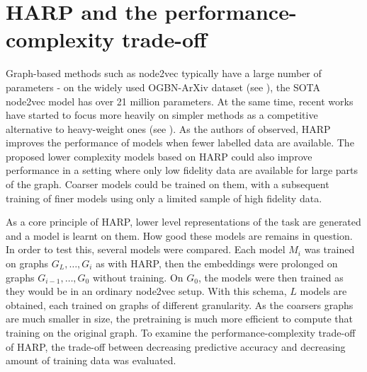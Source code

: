 \section{HARP and the performance-complexity trade-off}\label{sec:performance-vs-complexity}

Graph-based methods such as node2vec typically have a large number of parameters - on the widely used OGBN-ArXiv dataset (see \cite{hu_open_2021}), the SOTA node2vec model has over 21 million parameters. At the same time, recent works have started to focus more heavily on simpler methods as a competitive alternative to heavy-weight ones (see \cite{frasca_sign_2020,huang_combining_2020,salha_keep_2019,zhang_eigen-gnn_2020}). As the authors of \cite{chen_harp_2018} observed, HARP improves the performance of models when fewer labelled data are available. The proposed lower complexity models based on HARP could also improve performance in a setting where only low fidelity data are available for large parts of the graph. Coarser models could be trained on them, with a subsequent training of finer models using only a limited sample of high fidelity data.

As a core principle of HARP, lower level representations of the task are generated and a model is learnt on them. How good these models are remains in question. In order to test this, several models were compared. Each model \( M_i \) was trained on graphs \( G_L, \dots, G_i \) as with HARP, then the embeddings were prolonged on graphs \( G_{i-1}, \dots, G_0 \) without training. On \( G_0 \), the models were then trained as they would be in an ordinary node2vec setup. With this schema, \( L \) models are obtained, each trained on graphs of different granularity. As the coarsers graphs are much smaller in size, the pretraining is much more efficient to compute that training on the original graph. To examine the performance-complexity trade-off of HARP, the trade-off between decreasing predictive accuracy and decreasing amount of training data was evaluated.
